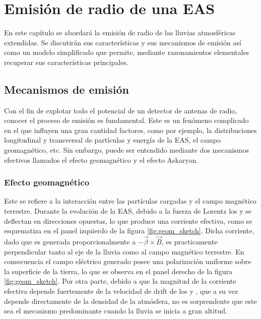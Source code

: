 \chapter{Emisi\'on de radio de una EAS}
\label{ch:easRadio}

En este capítulo se abordará la emisión de radio de las lluvias atmosféricas extendidas.
Se discutirán sus características y sus mecanismos de emisión así como un modelo simplificado que permite, mediante razonamientos elementales recuperar sus características principales.

\section{Mecanismos de emisi\'on}
	\label{sc:emision}
	
	Con el fin de explotar todo el potencial de un detector de antenas de radio, conocer el proceso de emisión es fundamental. 
	Este es un fenómeno complicado en el que influyen una gran cantidad factores, como por ejemplo, la distribuciones longitudinal y transversal de partículas y energía de la EAS, el campo geomagnético, etc.
	Sin embargo, puede ser entendido mediante dos mecanismos efectivos llamados el efecto geomagn\'etico y el efecto Askaryan.
	
	\subsection{Efecto geomagn\'etico}
	
	Este se refiere a la interacción entre las partículas cargadas y el campo magn\'etico terrestre.
	Durante la evoluci\'on de la EAS, debido a la fuerza de Lorentz los \el{+} y \el{-} se deflectan en direcciones opuestas, lo que produce una corriente efectiva, como se esquematiza en el panel izquierdo de la figura \ref{fig:geom_sketch}.
	Dicha corriente, dado que es generada proporcionalmente a $-\vec\beta\times \vec B$, es practicamente perpendicular tanto al eje de la lluvia como al campo magn\'etico terrestre.
	En consecuencia el campo el\'ectrico generado posee una polarizaci\'on uniforme sobre la superficie de la tierra, lo que se observa en el panel derecho de la figura \ref{fig:geom_sketch}.
	Por otra parte, debido a que la magnitud de la corriente efectiva depende fuertemente de la velocidad de drift de los \el{+} y \el{-}, que a su vez depende directamente de la densidad de la atm\'osfera, no es sorprendente que este sea el mecanismo predominante cuando la lluvia se inicia a gran altitud.
	
